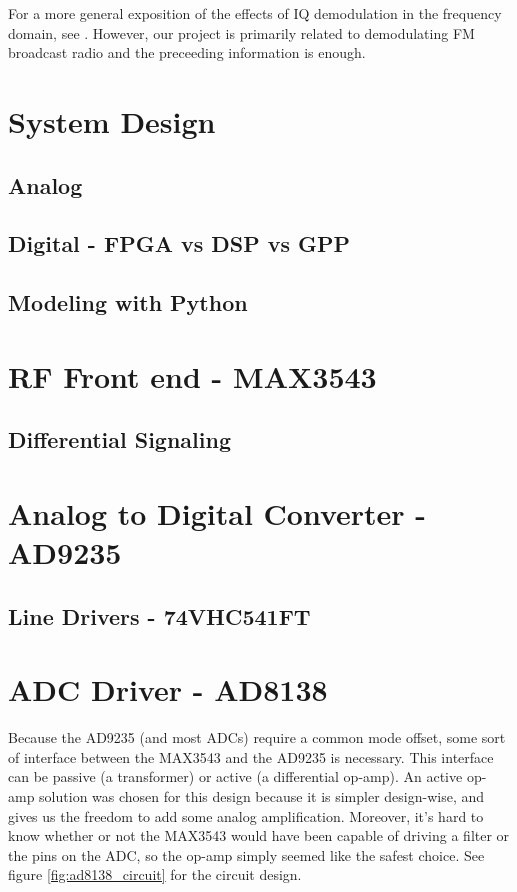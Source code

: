 \documentclass[a4paper, 12pt]{article}
\begin{document}
For a more general exposition of the effects of IQ demodulation in the frequency domain, see \cite{iq_sampling}.  However, our project is primarily related to demodulating FM broadcast radio and the preceeding information is enough.

\section{System Design}
\subsection{Analog}
\subsection{Digital - FPGA vs DSP vs GPP}
\subsection{Modeling with Python}

\section{RF Front end - MAX3543}
\subsection{Differential Signaling}

\section{Analog to Digital Converter - AD9235}
\subsection{Line Drivers - 74VHC541FT}

\section{ADC Driver - AD8138}
Because the AD9235 (and most ADCs) require a common mode offset, some sort of interface between the MAX3543 and the AD9235 is necessary.  This interface can be passive (a transformer) or active (a differential op-amp).  An active op-amp solution was chosen for this design because it is simpler design-wise, and gives us the freedom to add some analog amplification.  Moreover, it's hard to know whether or not the MAX3543 would have been capable of driving a filter or the pins on the ADC, so the op-amp simply seemed like the safest choice.  See figure \ref{fig:ad8138_circuit} for the circuit design.
\end{document}
